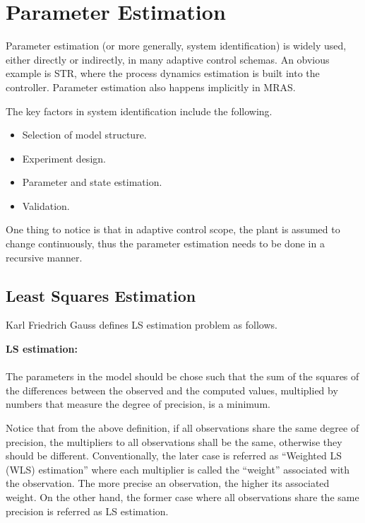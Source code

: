 \section{Parameter Estimation}

Parameter estimation (or more generally, system identification) is widely used, either directly or indirectly, in many adaptive control schemas. An obvious example is STR, where the process dynamics estimation is built into the controller. Parameter estimation also happens implicitly in MRAS.

The key factors in system identification include the following.
\begin{itemize}
	\item Selection of model structure.
	\item Experiment design.
	\item Parameter and state estimation.
	\item Validation.
\end{itemize}

One thing to notice is that in adaptive control scope, the plant is assumed to change continuously, thus the parameter estimation needs to be done in a recursive manner.

\subsection{Least Squares Estimation}

Karl Friedrich Gauss defines LS estimation problem as follows.

\begin{VF}
\textbf{LS estimation:}
\\
\\
\noindent The parameters in the model should be chose such that the sum of the squares of the differences between the observed and the computed values, multiplied by numbers that measure the degree of precision, is a minimum.
\end{VF}

Notice that from the above definition, if all observations share the same degree of precision, the multipliers to all observations shall be the same, otherwise they should be different. Conventionally, the later case is referred as ``Weighted LS (WLS) estimation'' where each multiplier is called the ``weight'' associated with the observation. The more precise an observation, the higher its associated weight. On the other hand, the former case where all observations share the same precision is referred as LS estimation.

